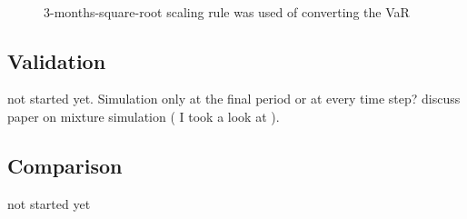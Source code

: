 \documentclass[]{article}
\begin{document}
\begin{figure}[H]
	 \\
	
	\caption{3-months-square-root scaling rule was used of converting the VaR}
	\label{some example}
\end{figure}

\subsection{Validation}
not started yet. Simulation only at the final period or at every time step? discuss paper on mixture simulation ( I took a look at \cite{Wang01} ).
\subsection{Comparison}
not started yet
\end{document}
